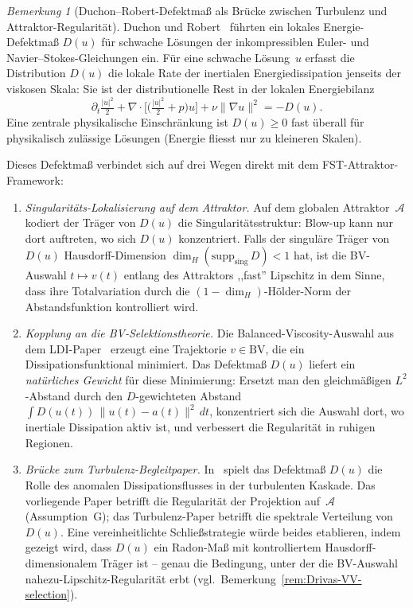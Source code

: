 \documentclass[12pt,a4paper]{article}
\theoremstyle{definition}
\theoremstyle{plain}
\theoremstyle{remark}
\newtheorem{remark}[definition]{Bemerkung}
\begin{document}
\begin{remark}[Duchon--Robert-Defektmaß als Brücke zwischen Turbulenz und Attraktor-Regularität]
\label{rem:duchon-robert}
Duchon und Robert~\cite{DuchonRobert2000} führten ein lokales
Energie-Defektmaß $D(u)$ für schwache Lösungen der inkompressiblen
Euler- und Navier--Stokes-Gleichungen ein.  Für eine schwache
Lösung~$u$ erfasst die Distribution $D(u)$ die lokale Rate der
inertialen Energiedissipation jenseits der viskosen Skala: Sie ist
der distributionelle Rest in der lokalen Energiebilanz
\[
  \partial_t \tfrac{|u|^2}{2}
  + \nabla \cdot \bigl[ \bigl(\tfrac{|u|^2}{2} + p\bigr) u \bigr]
  + \nu \|\nabla u\|^2
  = -D(u).
\]
Eine zentrale physikalische Einschränkung ist $D(u) \ge 0$ fast
überall für physikalisch zulässige Lösungen (Energie fliesst nur
zu kleineren Skalen).

Dieses Defektmaß verbindet sich auf drei Wegen direkt mit dem
FST-Attraktor-Framework:
\begin{enumerate}
\item \emph{Singularitäts-Lokalisierung auf dem Attraktor.}
Auf dem globalen Attraktor~$\mathcal{A}$ kodiert der Träger von
$D(u)$ die Singularitätsstruktur: Blow-up kann nur dort auftreten,
wo sich $D(u)$ konzentriert.  Falls der singuläre Träger von $D(u)$
Hausdorff-Dimension
$\dim_H(\mathrm{supp}_{\mathrm{sing}}\, D) < 1$ hat, ist die
BV-Auswahl $t \mapsto v(t)$ entlang des Attraktors ,,fast'' Lipschitz
in dem Sinne, dass ihre Totalvariation durch die
$(1-\dim_H)$-H\"older-Norm der Abstandsfunktion kontrolliert wird.
\item \emph{Kopplung an die BV-Selektionstheorie.}
Die Balanced-Viscosity-Auswahl aus dem LDI-Paper~\cite{Geiger2026-LDI}
erzeugt eine Trajektorie $v \in \mathrm{BV}$, die ein
Dissipationsfunktional minimiert.  Das Defektmaß $D(u)$ liefert
ein \emph{natürliches Gewicht} für diese Minimierung: Ersetzt man
den gleichmäßigen $L^2$-Abstand durch den $D$-gewichteten Abstand
$\int D(u(t))\, \|u(t) - a(t)\|^2\, dt$, konzentriert sich die
Auswahl dort, wo inertiale Dissipation aktiv ist, und verbessert die
Regularität in ruhigen Regionen.
\item \emph{Brücke zum Turbulenz-Begleitpaper.}
In~\cite{FST-TU2026} spielt das Defektmaß $D(u)$ die Rolle des
anomalen Dissipationsflusses in der turbulenten Kaskade.  Das
vorliegende Paper betrifft die Regularität der Projektion
auf~$\mathcal{A}$ (Assumption~G); das Turbulenz-Paper betrifft die
spektrale Verteilung von~$D(u)$.  Eine vereinheitlichte
Schließstrategie würde beides etablieren, indem gezeigt wird,
dass $D(u)$ ein Radon-Maß mit kontrolliertem
Hausdorff-dimensionalem Träger ist -- genau die Bedingung, unter
der die BV-Auswahl nahezu-Lipschitz-Regularität erbt
(vgl.~Bemerkung~\ref{rem:Drivas-VV-selection}).
\end{enumerate}
\end{remark}
\end{document}
